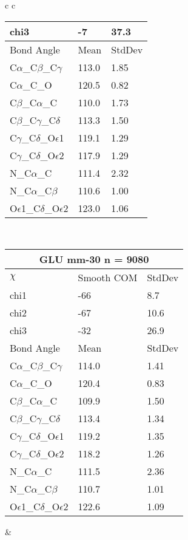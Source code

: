 \begin{longtable}{ c c }
\begin{tabular}{ l l l }
  chi3 & -7 & 37.3 \\ \midrule
  Bond Angle   & Mean     & StdDev \\ \midrule
  C$\alpha$\_C$\beta$\_C$\gamma$ & 113.0 & 1.85\\
  C$\alpha$\_C\_O & 120.5 & 0.82\\
  C$\beta$\_C$\alpha$\_C & 110.0 & 1.73\\
  C$\beta$\_C$\gamma$\_C$\delta$ & 113.3 & 1.50\\
  C$\gamma$\_C$\delta$\_O$\epsilon$1 & 119.1 & 1.29\\
  C$\gamma$\_C$\delta$\_O$\epsilon$2 & 117.9 & 1.29\\
  N\_C$\alpha$\_C & 111.4 & 2.32\\
  N\_C$\alpha$\_C$\beta$ & 110.6 & 1.00\\
  O$\epsilon$1\_C$\delta$\_O$\epsilon$2 & 123.0 & 1.06\\
  \bottomrule
  \end{tabular}
  \\
  \begin{tabular}{ l l l }
  \toprule
  \multicolumn{3}{c}{GLU \textbf{mm-30} n = 9080} \\ \toprule
  $\chi$       & Smooth COM & StdDev \\ \midrule
  chi1 & -66 & 8.7 \\ 
  chi2 & -67 & 10.6 \\ 
  chi3 & -32 & 26.9 \\ \midrule
  Bond Angle   & Mean     & StdDev \\ \midrule
  C$\alpha$\_C$\beta$\_C$\gamma$ & 114.0 & 1.41\\
  C$\alpha$\_C\_O & 120.4 & 0.83\\
  C$\beta$\_C$\alpha$\_C & 109.9 & 1.50\\
  C$\beta$\_C$\gamma$\_C$\delta$ & 113.4 & 1.34\\
  C$\gamma$\_C$\delta$\_O$\epsilon$1 & 119.2 & 1.35\\
  C$\gamma$\_C$\delta$\_O$\epsilon$2 & 118.2 & 1.26\\
  N\_C$\alpha$\_C & 111.5 & 2.36\\
  N\_C$\alpha$\_C$\beta$ & 110.7 & 1.01\\
  O$\epsilon$1\_C$\delta$\_O$\epsilon$2 & 122.6 & 1.09\\
  \bottomrule
  \end{tabular}
  &
  \\
  
\end{longtable}

